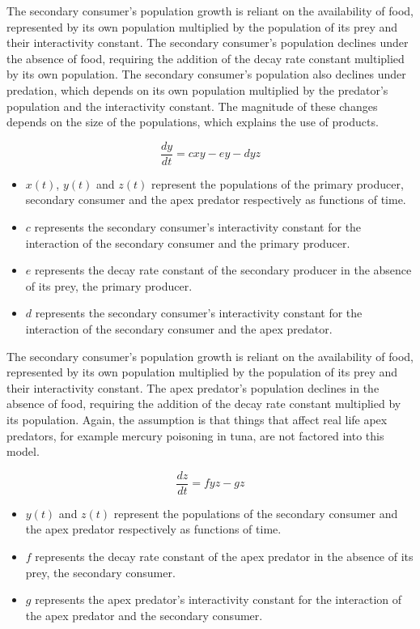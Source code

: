 \documentclass[11pt,oneside]{article}
\begin{document}
	The secondary consumer's population growth is reliant on the availability of food, represented by its own population multiplied by the population of its prey and their interactivity constant. The secondary consumer's population declines under the absence of food, requiring the addition of the decay rate constant multiplied by its own population. The secondary consumer's population also declines under predation, which depends on its own population multiplied by the predator's population and the interactivity constant. The magnitude of these changes depends on the size of the populations, which explains the use of products.
	
	\begin{equation}
	\frac{dy}{dt} = cxy - ey -dyz
	\end{equation}
	\begin{itemize}
		\item $x(t)$, $y(t)$ and $z(t)$ represent the populations of the primary producer, secondary consumer and the apex predator respectively as functions of time.
		\item $c$ represents the secondary consumer's interactivity constant for the interaction of the secondary consumer and the primary producer.
		\item $e$ represents the decay rate constant of the secondary producer in the absence of its prey, the primary producer.
		\item $d$ represents the secondary consumer's interactivity constant for the interaction of the secondary consumer and the apex predator.
	\end{itemize}
	
	The secondary consumer's population growth is reliant on the availability of food, represented by its own population multiplied by the population of its prey and their interactivity constant. The apex predator's population declines in the absence of food, requiring the addition of the decay rate constant multiplied by its population. Again, the assumption is that things that affect real life apex predators, for example mercury poisoning in tuna, are not factored into this model.
	
	\begin{equation}
	\frac{dz}{dt} = fyz - gz
	\end{equation}
	\begin{itemize}
		\item $y(t)$ and $z(t)$ represent the populations of the secondary consumer and the apex predator respectively as functions of time.
		\item $f$ represents the decay rate constant of the apex predator in the absence of its prey, the secondary consumer.
		\item $g$ represents the apex predator's interactivity constant for the interaction of the apex predator and the secondary consumer.
	\end{itemize}
	
\end{document}
